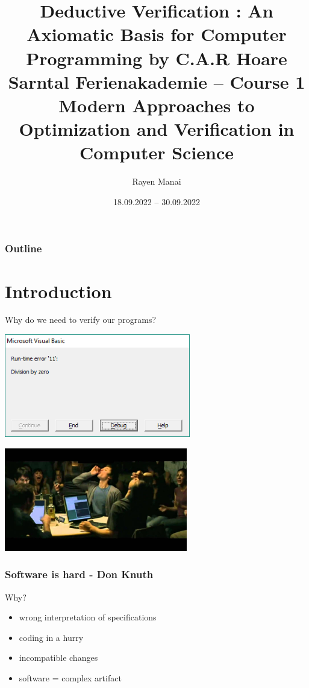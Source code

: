 \documentclass{beamer}
\title[Deductive Verification]{
	\Large Deductive Verification : An Axiomatic Basis for Computer Programming by C.A.R Hoare\\
	[5mm] \normalsize Sarntal Ferienakademie -- Course 1 \\
	Modern Approaches to Optimization and Verification in Computer Science
}
\author{Rayen Manai}
\institute[]{
    TU München\\
}
\date{18.09.2022 -- 30.09.2022}
\begin{document}
\begin{frame}
	\titlepage
\end{frame}

\begin{frame}
	\frametitle{Outline}
	\tableofcontents
\end{frame}

\section{Introduction}
\begin{frame}
 \begin{center}
                Why do we need to verify our programs?
        \end{center}

\end{frame}
	\begin{frame}
\center
  \includegraphics[height=45mm]{error}
	\end {frame}
	\begin{frame}
 \center 
\includegraphics[height=45mm]{social_network}
\end{frame}

\begin{frame}
        \frametitle{Software is hard - Don Knuth}
Why?
\begin{itemize}

  \item {wrong interpretation of specifications}
  \item {coding in a hurry}
  \item {incompatible changes}
  \item {software = complex artifact}

\end{itemize}
\end{frame}
\end{document}
